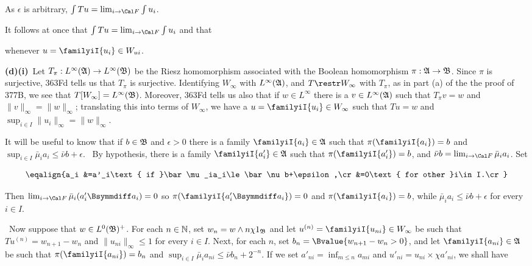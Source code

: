 {\noindent As $\epsilon$ is arbitrary, $\int Tu=\lim_{i\to\Cal F}\int u_i$.

\medskip

 It follows at once that
$\int Tu=\lim_{i\to\Cal F}\int u_i$
and that


\noindent whenever $u=\familyiI{u_i}\in W_{ui}$.

\medskip

{\bf (d)(i)}\grheada\
Let $T_{\pi}:L^{\infty}(\frak A)\to L^{\infty}(\frak B)$
be the Riesz homomorphism associated with the Boolean homomorphism
$\pi:\frak A\to\frak B$.   Since $\pi$ is surjective,
363Fd tells us that $T_{\pi}$ is surjective.
Identifying $W_{\infty}$ with
$L^{\infty}(\frak A)$, and $T\restr W_{\infty}$ with
$T_{\pi}$, as in part (a) of the
the proof of 377B, we see that $T[W_{\infty}]=L^{\infty}(\frak B)$.
Moreover, 363Fd tells us also that if $w\in L^{\infty}$ there is a
$v\in L^{\infty}(\frak A)$ such that $T_{\pi}v=w$ and
$\|v\|_{\infty}=\|w\|_{\infty}$;  translating this into terms of
$W_{\infty}$, we have a $u=\familyiI{u_i}\in W_{\infty}$ such that
$Tu=w$ and $\sup_{i\in I}\|u_i\|_{\infty}=\|w\|_{\infty}$.

It will be useful to know that if $b\in\frak B$ and $\epsilon>0$ there is a
family $\familyiI{a_i}\in\frak A$ such that $\pi(\familyiI{a_i})=b$ and
$\sup_{i\in I}\bar\mu_ia_i\le\bar\nu b+\epsilon$.   \Prf\ By hypothesis,
there is a family $\familyiI{a'_i}\in\frak A$ such that
$\pi(\familyiI{a'_i})=b$, and $\bar\nu b=\lim_{i\to\Cal F}\bar\mu_ia_i$.
Set

$$\eqalign{a_i
&=a'_i\text{ if }\bar\mu_ia_i\le\bar\nu b+\epsilon,\cr
&=0\text{ for other }i\in I.\cr}$$

\noindent Then $\lim_{i\to\Cal F}\bar\mu_i(a'_i\Bsymmdiff a_i)=0$ so
$\pi(\familyiI{a'_i\Bsymmdiff a_i})=0$ and $\pi(\familyiI{a_i})=b$, while
$\bar\mu_ia_i\le\bar\nu b+\epsilon$ for every $i\in I$.\ \Qed

\medskip

\qquad\grheadb\ Now suppose that $w\in L^0(\frak B)^+$.   For each
$n\in\Bbb N$, set $w_n=w\wedge n\chi 1_{\frak B}$ and
let $u^{(n)}=\familyiI{u_{ni}}\in W_{\infty}$ be such that
$Tu^{(n)}=w_{n+1}-w_n$ and $\|u_{ni}\|_{\infty}\le 1$ for
every $i\in I$.   Next, for each $n$, set $b_n=\Bvalue{w_{n+1}-w_n>0}$,
and let
$\familyiI{a_{ni}}\in\frak A$ be such that $\pi(\familyiI{a_{ni}})=b_n$ and
$\sup_{i\in I}\bar\mu_ia_{ni}\le\bar\nu b_n+2^{-n}$.   If we set
$a'_{ni}=\inf_{m\le n}a_{mi}$ and
$u'_{ni}=u_{ni}\times\chi a'_{ni}$, we shall have

}

